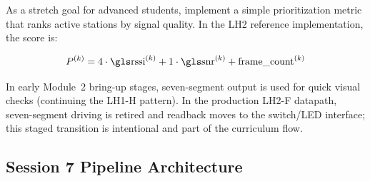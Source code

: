 \documentclass[11pt,letterpaper]{article}
\begin{document}
	As a stretch goal for advanced students, implement a simple prioritization metric that ranks active stations by signal quality. In the LH2 reference implementation, the score is:

	\begin{equation}
		P^{(k)} = 4\cdot \text{\RSSI{}}^{(k)} + 1\cdot \text{\SNR{}}^{(k)} + \text{frame\_count}^{(k)}
		\label{eq:priority}
	\end{equation}

	In early Module~2 bring-up stages, seven-segment output is used for quick visual checks (continuing the LH1-H pattern). In the production LH2-F datapath, seven-segment driving is retired and readback moves to the switch/LED interface; this staged transition is intentional and part of the curriculum flow.

	\subsection{Session 7 Pipeline Architecture}
\end{document}
